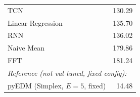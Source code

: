 \begin{table}[t]
\begin{tabular}{l r}
TCN                                & 130.29 \\
Linear Regression                  & 135.70 \\
RNN                                & 136.02 \\
Naive Mean                         & 179.86 \\
FFT                                & 181.24 \\
\midrule
\multicolumn{2}{l}{\emph{Reference (not val-tuned, fixed config):}} \\
pyEDM (Simplex, $E{=}5$, fixed)    & 14.48 \\
\bottomrule
\end{tabular}
\end{table}


